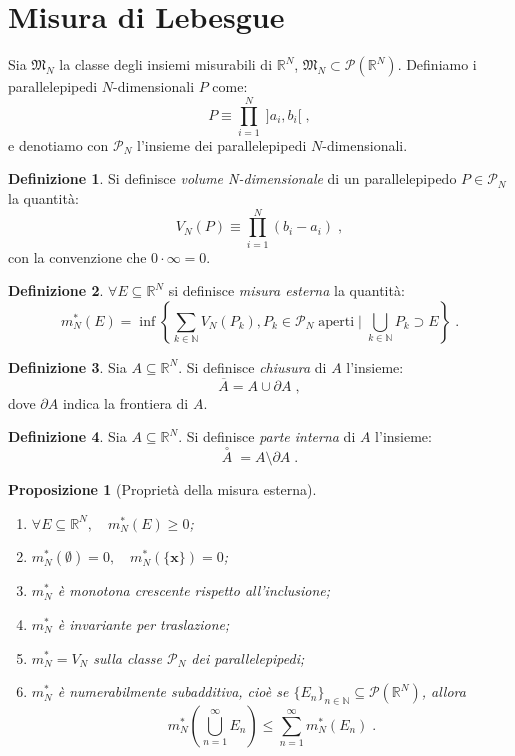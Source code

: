 \documentclass[a4paper,12pt]{report}
\theoremstyle{plain}
\newtheorem{prop}{Proposizione}[section]
\theoremstyle{definition}
\newtheorem{defn}{Definizione}[section]
\theoremstyle{remark}
\numberwithin{equation}{section}
\begin{document}
\section{Misura di Lebesgue}
Sia $\mathfrak{M}_N$ la classe degli insiemi misurabili di $\mathbb{R}^N$, $\mathfrak{M}_N \subset \mathcal{P}(\mathbb{R}^N)$. Definiamo i parallelepipedi $N$-dimensionali $P$ come:
\begin{equation}
P\equiv\prod_{i=1}^N\;]a_i,b_i[\;,
\end{equation}
e denotiamo con $\mathcal{P}_N$ l'insieme dei parallelepipedi $N$-dimensionali.
\begin{defn} Si definisce \textit{volume N-dimensionale} di un parallelepipedo $P \in \mathcal{P}_N$ la quantità:
\begin{equation}
V_N(P)\equiv \prod_{i=1}^N (b_i-a_i)\;,
\end{equation}
con la convenzione che $0\cdot \infty=0$.
\end{defn}
\begin{defn} $\forall E \subseteq \mathbb{R}^N$ si definisce \textit{misura esterna} la quantità:
\begin{equation}
m_N^*(E)=\inf\left\{\sum_{k \in \mathbb{N}} V_N(P_k), P_k \in \mathcal{P}_N\;\mbox{aperti}\;|\;\bigcup_{k \in \mathbb{N}} P_k \supset E
\right\}\;.
\end{equation}
\end{defn}
\begin{defn} Sia $A \subseteq \mathbb{R}^N$. Si definisce \textit{chiusura} di $A$ l'insieme:
\begin{equation}
\overline{A}=A \cup \partial A\;,
\end{equation}
dove $\partial A$ indica la frontiera di $A$.
\end{defn}
\begin{defn} Sia $A \subseteq \mathbb{R}^N$. Si definisce \textit{parte interna} di $A$ l'insieme:
\begin{equation}
\stackrel{\circ}{A}\;=A \setminus \partial A\;.
\end{equation}
\end{defn}
\begin{prop}[Proprietà della misura esterna]
 \begin{enumerate}
  \item $\forall E \subseteq \mathbb{R}^N,\quad m_N^*(E)\ge 0$;
 \item $m_N^*(\emptyset)=0, \quad m_N^*(\{\mathbf{x}\})=0$;
 \item $m_N^*$ è monotona crescente rispetto all'inclusione;
 \item $m_N^*$ è invariante per traslazione;
 \item $m_N^*=V_N$ sulla classe $\mathcal{P}_N$ dei parallelepipedi;
 \item $m_N^*$ è numerabilmente subadditiva, cioè se $\{E_n\}_{n \in \mathbb{N}}\subseteq \mathcal{P}(\mathbb{R}^N)$, allora
\begin{equation}
m_N^*\left(\bigcup_{n=1}^{\infty} E_n\right) \le \sum_{n=1}^{\infty} m_N^*(E_n)\;.
\end{equation}
 \end{enumerate}
\end{prop}
\end{document}
